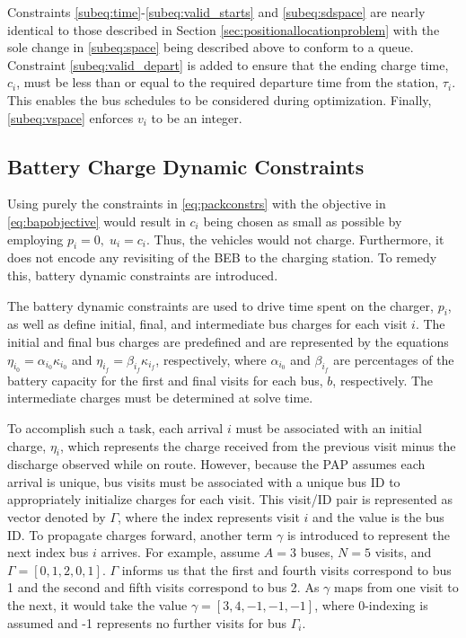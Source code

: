 \documentclass[letterpaper, 10pt, conference]{IEEEtran}
\begin{document}
Constraints \eqref{subeq:time}-\eqref{subeq:valid_starts} and \eqref{subeq:sdspace} are nearly identical to those
described in Section \ref{sec:positionallocationproblem} with the sole change in \eqref{subeq:space} being described
above to conform to a queue. Constraint \eqref{subeq:valid_depart} is added to ensure that the ending charge time,
$c_i$, must be less than or equal to the required departure time from the station, $\tau_i$. This enables the bus schedules
to be considered during optimization. Finally, \eqref{subeq:vspace} enforces $v_i$ to be an integer.

\subsection{Battery Charge Dynamic Constraints}
\label{sec:batt_dynamics}
Using purely the constraints in \eqref{eq:packconstrs} with the objective in \eqref{eq:bapobjective} would result in
$c_i$ being chosen as small as possible by employing $p_i = 0,\; u_i = c_i$. Thus, the vehicles would not charge.
Furthermore, it does not encode any revisiting of the BEB to the charging station. To remedy this, battery dynamic
constraints are introduced.

The battery dynamic constraints are used to drive time spent on the charger, $p_i$, as well as define initial, final,
and intermediate bus charges for each visit $i$. The initial and final bus charges are predefined and are represented by
the equations $\eta_{i_0} = \alpha_{i_0} \kappa_{i_0}$ and $\eta_{i_f} = \beta_{i_f} \kappa_{i_f}$, respectively, where $\alpha_{i_0}$ and $\beta_{i_f}$
are percentages of the battery capacity for the first and final visits for each bus, $b$, respectively. The intermediate
charges must be determined at solve time.

To accomplish such a task, each arrival $i$ must be associated with an initial charge, $\eta_i$, which represents the
charge received from the previous visit minus the discharge observed while on route. However, because the PAP assumes
each arrival is unique, bus visits must be associated with a unique bus ID to appropriately initialize charges for each
visit. This visit/ID pair is represented as vector denoted by $\Gamma$, where the index represents visit $i$ and the value is
the bus ID. To propagate charges forward, another term $\gamma$ is introduced to represent the next index bus $i$ arrives.
For example, assume $A = 3$ buses, $N = 5$ visits, and $\Gamma = [0,1,2,0,1]$. $\Gamma$ informs us that the first and fourth
visits correspond to bus 1 and the second and fifth visits correspond to bus 2. As $\gamma$ maps from one visit to the next,
it would take the value $\gamma = [3,4,-1,-1,-1]$, where 0-indexing is assumed and -1 represents no further visits for bus
$\Gamma_i$.
\end{document}
